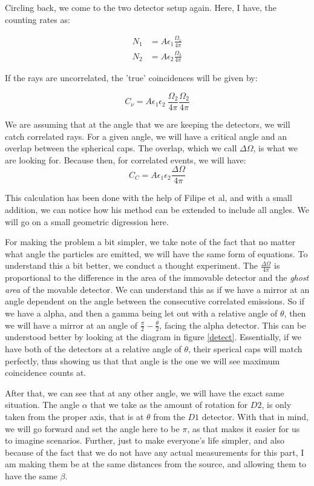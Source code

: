 \documentclass{double}
\begin{document}
\begin{multicols*}{2}
Circling back, we come to the two detector setup again.
Here, I have, the counting rates as:

\begin{align}
    N_1 &= A\epsilon_1 \frac{\Omega_1}{4\pi} \nonumber\\
    N_2 &= A\epsilon_2 \frac{\Omega_2}{4\pi}
\end{align}

If the rays are uncorrelated, the 'true' coincidences will
be given by:

\begin{equation}
    C_\nu = A \epsilon_1 \epsilon_2 \ \frac{\Omega_2}{4\pi}
    \frac{\Omega_2}{4\pi}
\end{equation}

We are assuming that at the angle that we are keeping the
detectors, we will catch correlated rays. For a given angle,
we will have a critical angle and an overlap between the
spherical caps. The overlap, which we call $\Delta \Omega$,
is what we are looking for. Because then, for correlated
events, we will have:
\begin{equation}
    C_C = A \epsilon_1 \epsilon_2 \frac{\Delta \Omega}{4 \pi}
\end{equation}

This calculation has been done with the help of Filipe et
al, and with a small addition, we can notice how his method
can be extended to include all angles. We will go on a small
geometric digression here.

For making the problem a bit simpler, we take note of the
fact that no matter what angle the particles are emitted, we
will have the same form of equations. To understand this a
bit better, we conduct a thought experiment. The
$\frac{\Delta \Omega}{4\pi}$ is proportional to the
difference in the area of the immovable detector and the
\emph{ghost area} of the movable detector. We can understand
this as if we have a mirror at an angle dependent on the
angle between the consecutive correlated emissions. So if we
have a alpha, and then a gamma being let out with a relative
angle of $\theta$, then we will have a mirror at an angle of
$\frac{\pi}{2} - \frac{\theta}{2}$, facing the alpha detector. This
can be understood better by looking at the diagram in
figure \ref{detect}. Essentially, if we have both of the detectors at a
relative angle of $\theta$, their sperical caps will match
perfectly, thus showing us that that angle is the one we
will see maximum coincidence counts at.

After that, we can see that at any other angle, we will have
the exact same situation. The angle $\alpha$ that we take as
the amount of rotation for $D2$, is only taken from the
proper axis, that is at $\theta$ from the $D1$ detector.
With that in mind, we will go forward and set the angle here
to be $\pi$, as that makes it easier for us to imagine
scenarios. Further, just to make everyone's life simpler,
and also because of the fact that we do not have any actual
measurements for this part, I am making them be at the same
distances from the source, and allowing them to have the
same $\beta$. 


\end{multicols*}
\end{document}
